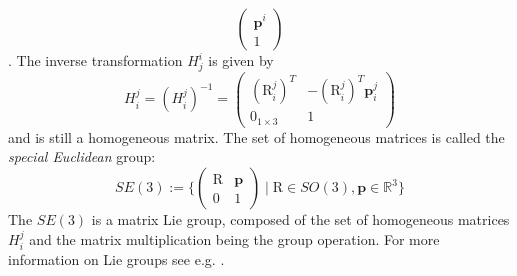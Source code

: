 \documentclass[a4paper,twoside, openright,12pt]{report}
\newcommand{\f}[1]{\boldsymbol{#1}}
\newcommand{\g}[1]{\text{#1}}
\begin{document}
{\begin{equation}
\begin{pmatrix}
		\f{p}^i \\ 1\end{pmatrix}
\end{equation}.
The inverse transformation $ H_j^i $ is given by 
\[H_i^j = (H_i^j)^{-1} = \begin{pmatrix}(\g{R}_i^j)^T & -(\g{R}_i^j)^T \f{p}_i^j \\ 0_{1 \times 3} & 1\end{pmatrix} \]
and is still a homogeneous matrix.
The set of homogeneous matrices is called the \emph{special Euclidean} group:
\begin{equation}
	SE(3) := \{\begin{pmatrix}\g{R} & \f{p}\\0 & 1\end{pmatrix} \; | \; \g{R} \in SO(3), \f{p} \in \mathbb{R}^3\} 
\end{equation}
The $SE(3)$ is a matrix Lie group, composed of the set of homogeneous matrices $H_i^j$ and the matrix multiplication being the group operation. For more information on Lie groups see e.g. \cite{Stramigioli_01}.
}
\end{document}
